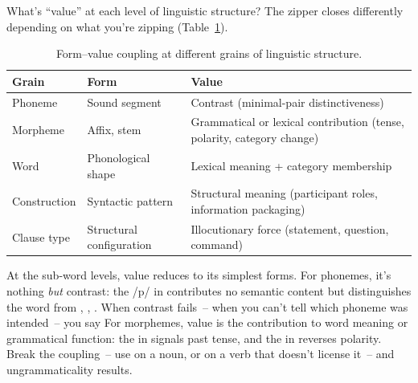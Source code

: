 What's \enquote{value} at each level of linguistic structure? The zipper closes differently depending on what you're zipping (Table~\ref{tab:form-value-grains}).

\begin{table}[h]
\centering
\small
\begin{tabular}{@{}l>{\raggedright\arraybackslash}p{}>{\raggedright\arraybackslash}p{}@{}}
\toprule
\textbf{Grain} & \textbf{Form} & \textbf{Value} \\
\midrule
Phoneme & Sound segment & Contrast (minimal-pair distinctiveness) \\
Morpheme & Affix, stem & Grammatical or lexical contribution (tense, polarity, category change) \\
Word & Phonological shape & Lexical meaning + category membership \\
Construction & Syntactic pattern & Structural meaning (participant roles, information packaging) \\
Clause type & Structural configuration & Illocutionary force (statement, question, command) \\
\bottomrule
\end{tabular}
\caption{Form--value coupling at different grains of linguistic structure.}
\label{tab:form-value-grains}
\end{table}

At the sub-word levels, value reduces to its simplest forms. For phonemes, it's nothing \emph{but} contrast: the /p/ in  contributes no semantic content but distinguishes the word from , , . When contrast fails~-- when you can't tell which phoneme was intended~-- you say  For morphemes, value is the contribution to word meaning or grammatical function: the  in  signals past tense, and the  in  reverses polarity. Break the coupling~-- use  on a noun, or  on a verb that doesn't license it~-- and ungrammaticality results.

